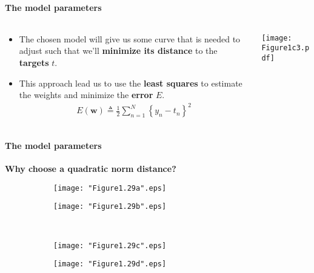 \begin{frame}{\insertsubsection}
	\framesubtitle{The model parameters}
\begin{columns}
\begin{column}{0.475\textwidth}
	\begin{itemize}
		\item The chosen model will give us some curve that is needed to adjust such that we'll \textcolor{UniOrange}{\textbf{minimize its distance}} to the \textcolor{UniOrange}{\textbf{targets}} $t$.
		\item This approach lead us to use the \textcolor{UniOrange}{\textbf{least squares}} to estimate the weights and minimize the \textcolor{UniOrange}{\textbf{error}} $E$.
		\begin{align*}
			E(\mathbf{w}) \triangleq \frac{1}{2} \sum_{n=1}^N \left\{ y_n -  t_n \right\}^2
		\end{align*}
	\end{itemize}
\end{column}
\begin{column}{0.475\textwidth}  
    \begin{center}
	\centering
	\texttt{[image: Figure1c3.pdf]}
     \end{center}
\end{column}
\end{columns}

\end{frame}


\begin{frame}{\insertsubsection}
	\framesubtitle{The model parameters}
	\textcolor{UniGold}{\textbf{Why choose a quadratic norm distance?}}
	\begin{figure}
    \begin{subfigure}[t]{0.5\textwidth}
        \centering
        \texttt{[image: "Figure1.29a".eps]}
    \end{subfigure}%
    \begin{subfigure}[t]{0.5\textwidth}
        \centering
        \texttt{[image: "Figure1.29b".eps]}
		\end{subfigure}
		\\
	\begin{subfigure}[t]{0.5\textwidth}
		\centering
		\texttt{[image: "Figure1.29c".eps]}
	\end{subfigure}%
	\begin{subfigure}[t]{0.5\textwidth}
		\centering
		\texttt{[image: "Figure1.29d".eps]}
	\end{subfigure}
	\end{figure}
\end{frame}


